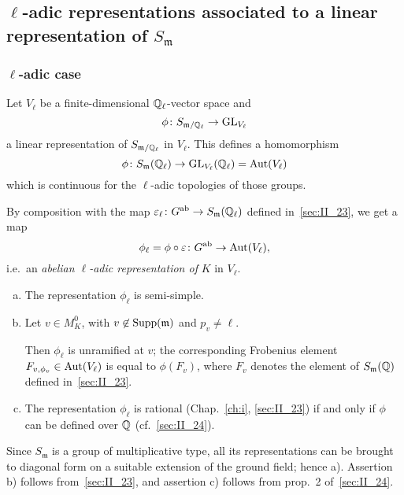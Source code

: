 \subsection{\texorpdfstring{$\ell$}{ℓ}-adic representations associated to a
linear representation of \texorpdfstring{$S_{\mathfrak{m}}$}{Sm}}
\label{sec:II_25}
\dpage

\subsubsection{\texorpdfstring{$\ell$}{ℓ}-adic case}

Let $V_\ell$ be a finite-dimensional $\mathbb{Q}_\ell$-vector space and
\[
	\phi \colon S_{\mathfrak{m} / \mathbb{Q}_\ell} \rightarrow \operatorname{GL}_{V_\ell}
\]
a linear representation of $S_{\mathfrak{m} / \mathbb{Q}_\ell}$ in $V_\ell$. This 
defines a homomorphism
\[
	\phi \colon S_\mathfrak{m}(\mathbb{Q}_\ell) \rightarrow \operatorname{GL}_{V_\ell}(\mathbb{Q}_\ell) = 
	\operatorname{Aut}(V_\ell)
\]
which is continuous for the $\ell$-adic topologies of those groups.

By composition with the map $\varepsilon_\ell \colon G^{\mathrm{ab}} \to
S_{\mathfrak{m}} (\mathbb{Q}_\ell)$ defined in~\ref{sec:II_23}, we get a map
\[
	\phi_\ell = \phi \circ \varepsilon \colon G^{\mathrm{ab}} \to \operatorname{Aut}(V_\ell),
\]
i.e.\ an \emph{abelian $\ell$-adic representation of} $K$ in $V_\ell$.

\begin{prop}
\begin{enumerate}[a)]
	\item The representation $\phi_\ell$ is semi-simple.
	\item Let $v \in M_K^0$, with $v \not\in \operatorname{Supp}(\mathfrak{m})$ and $p_v \neq 
	\ell$.

Then $\phi_\ell$ is unramified at $v$; the corresponding Frobenius element 
$F_{v, \phi_v} \in \operatorname{Aut}(V_\ell)$ is equal to $\phi(F_v)$, where $F_v$ denotes 
the element of $S_\mathfrak{m}(\mathbb{Q})$ defined in~\ref{sec:II_23}.
\dpage
	\item The representation $\phi_\ell$ is rational (Chap.~\ref{ch:i},
		\ref{sec:II_23}) if and only if $\phi$ can be defined over $\mathbb{Q}$
		(cf.\ \ref{sec:II_24}).
\end{enumerate}
\end{prop}

Since $S_\mathfrak{m}$ is a group of multiplicative type, all its 
representations can be brought to diagonal form on a suitable extension of the 
ground field; hence a). Assertion b) follows from~\ref{sec:II_23}, and 
assertion c) follows from prop.~2 of~\ref{sec:II_24}.

